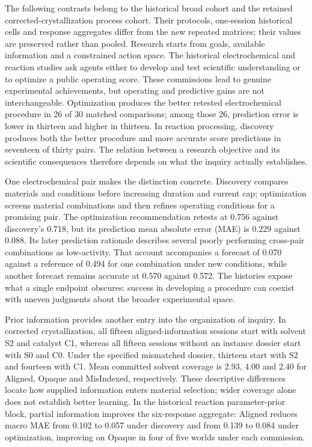 \documentclass[10pt,a4paper]{article}
\begin{document}
The following contrasts belong to the historical broad cohort and the retained corrected-crystallization process cohort. Their protocols, one-session historical cells and response aggregates differ from the new repeated matrices; their values are preserved rather than pooled. Research starts from goals, available information and a constrained action space. The historical electrochemical and reaction studies ask agents either to develop and test scientific understanding or to optimize a public operating score. These commissions lead to genuine experimental achievements, but operating and predictive gains are not interchangeable. Optimization produces the better retested electrochemical procedure in 26 of 30 matched comparisons; among those 26, prediction error is lower in thirteen and higher in thirteen. In reaction processing, discovery produces both the better procedure and more accurate score predictions in seventeen of thirty pairs. The relation between a research objective and its scientific consequences therefore depends on what the inquiry actually establishes.

One electrochemical pair makes the distinction concrete. Discovery compares materials and conditions before increasing duration and current cap; optimization screens material combinations and then refines operating conditions for a promising pair. The optimization recommendation retests at 0.756 against discovery's 0.718, but its prediction mean absolute error (MAE) is 0.229 against 0.088. Its later prediction rationale describes several poorly performing cross-pair combinations as low-activity. That account accompanies a forecast of 0.070 against a reference of 0.494 for one combination under new conditions, while another forecast remains accurate at 0.570 against 0.572. The histories expose what a single endpoint obscures: success in developing a procedure can coexist with uneven judgments about the broader experimental space.

Prior information provides another entry into the organization of inquiry. In corrected crystallization, all fifteen aligned-information sessions start with solvent S2 and catalyst C1, whereas all fifteen sessions without an instance dossier start with S0 and C0. Under the specified mismatched dossier, thirteen start with S2 and fourteen with C1. Mean committed solvent coverage is 2.93, 4.00 and 2.40 for Aligned, Opaque and MisIndexed, respectively. These descriptive differences locate how supplied information enters material selection; wider coverage alone does not establish better learning. In the historical reaction parameter-prior block, partial information improves the six-response aggregate: Aligned reduces macro MAE from 0.102 to 0.057 under discovery and from 0.139 to 0.084 under optimization, improving on Opaque in four of five worlds under each commission.
\end{document}
